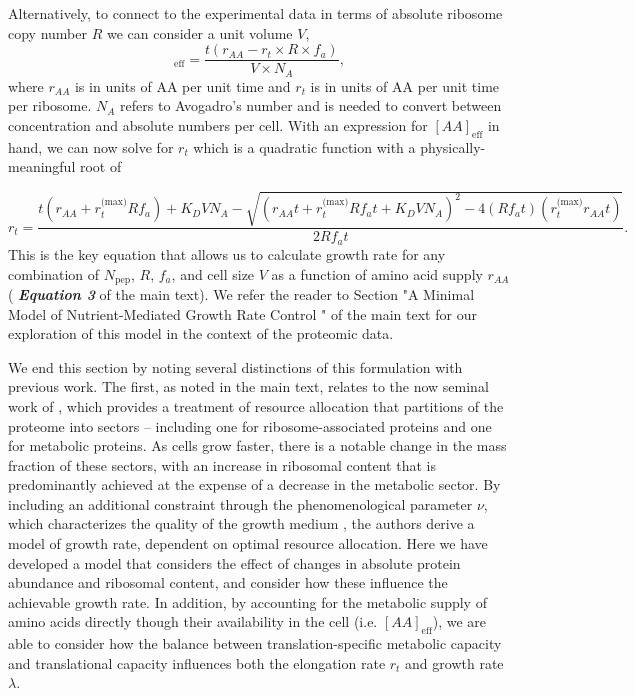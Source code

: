 Alternatively, to connect to the experimental data in terms of absolute ribosome
copy number $R$ we can consider a unit volume $V$,
\begin{equation}
   [AA]_\text{eff} = \frac{t(r_{AA} - r_t \times R \times f_a)}{V \times N_A},
   \label{eq:aa_final}
\end{equation}
where $r_{AA}$ is in units of AA per unit time and $r_t$ is in units of AA per
unit time per ribosome. $N_A$ refers to Avogadro's number and is needed to
convert between  concentration and absolute numbers per cell. With an expression
for $[AA]_\text{eff}$ in hand, we can now solve  for $r_t$
which is a quadratic function with a physically-meaningful root of

\begin{equation}
r_t = \frac{t(r_{AA} + r_t^\text{(max)}Rf_a) + K_D V N_A - \sqrt{(r_{AA}t + r_t^\text{(max)}Rf_at + K_D V N_A)^2 - 4(Rf_at)(r_t^\text{(max)}r_{AA} t)}}{2Rf_at}.
\label{eq:rt_root}
\end{equation}
This is the key equation that allows us to calculate growth rate for any
combination of $N_\text{pep}$, $R$, $f_a$, and cell size $V$ as a function of
amino acid supply $r_{AA}$ ( \textbf{\textit{Equation 3}}  of the main text). We refer the
reader to Section "A Minimal Model of Nutrient-Mediated Growth Rate Control " of the main text for our exploration of this
model in the context of the proteomic data.

We end this section by noting several distinctions of this formulation with
previous work. The first, as noted in the main text, relates to the now seminal
work of \cite{scott2010}, which provides a treatment of resource allocation that
partitions of the proteome into sectors -- including one for ribosome-associated
proteins and one for metabolic proteins. As cells grow faster, there is a
notable change in the mass fraction of these sectors, with an increase in
ribosomal content that is predominantly achieved at the expense of a decrease in
the metabolic sector. By including an additional constraint through the
phenomenological parameter $\nu$,  which characterizes the quality of the growth
medium \cite{scott2010, klumpp2013, klumpp2014}, the authors derive a model of
growth rate, dependent on optimal resource allocation. Here we have developed a
model that considers the effect of changes in absolute protein abundance and
ribosomal content, and consider how these influence the achievable growth rate.
In addition, by accounting for the metabolic supply of amino acids directly
though their availability in the cell (i.e. $[AA]_\text{eff}$), we are able to
consider how the balance between translation-specific metabolic capacity and
translational capacity influences both the elongation rate $r_t$ and growth
rate $\lambda$.

